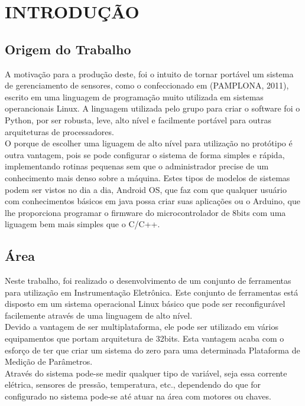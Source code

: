 \documentclass[a4paper, 12pt]{article}
\begin{document}
\section{INTRODUÇÃO}
\vspace{0.5cm}
\subsection{Origem do Trabalho}

\indent\indent A motivação para a produção deste, foi o intuito de tornar portável um sistema de gerenciamento de sensores, como o confeccionado em (PAMPLONA, 2011),
 escrito em uma linguagem de programação muito utilizada em sistemas operancionais Linux. A linguagem utilizada pelo grupo para criar o software foi o Python,
 por ser robusta, leve, alto nível e facilmente portável para outras arquiteturas de processadores. 
\\
\indent O porque de escolher uma liguagem de alto nível para utilização no protótipo é outra vantagem, pois se pode configurar o sistema de forma simples
 e rápida, implementando rotinas pequenas sem que o administrador precise de um conhecimento mais denso sobre a máquina. Estes tipos de modelos de sistemas 
podem ser vistos no dia a dia, Android OS, que faz com que qualquer usuário com conhecimentos básicos em java possa criar suas aplicações ou o Arduino, que 
lhe proporciona programar o firmware do microcontrolador de 8bits com uma liguagem bem mais simples que o C/C++.

\subsection{Área}
\indent\indent Neste trabalho, foi realizado o desenvolvimento de um conjunto de ferramentas para utilização em Instrumentação Eletrônica. Este conjunto de 
ferramentas está disposto em um sistema operacional Linux básico que pode ser reconfigurável facilemente através de uma linguagem de alto nível.
\\
\indent Devido a vantagem de ser multiplataforma, ele pode ser utilizado em vários equipamentos que portam arquitetura de 32bits. Esta vantagem acaba com o
 esforço de ter que criar um sistema do zero para uma determinada Plataforma de Medição de Parâmetros.
\\
\indent	Através do sistema pode-se medir qualquer tipo de variável, seja essa corrente elétrica, sensores de pressão, temperatura, etc., dependendo do que 
for configurado no sistema pode-se até atuar na área com motores ou chaves.
\end{document}

